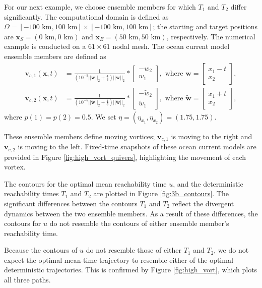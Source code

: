 \documentclass[pdflatex,sn-mathphys-num]{sn-jnl}%
\def \bx{{\mathbf {x}}}
\def \bv{{\mathbf {v}}}
\def \bw{{\mathbf {w}}}
\theoremstyle{thmstyleone}%
\theoremstyle{thmstyletwo}%
\theoremstyle{thmstylethree}%
\begin{document}
For our next example, we choose ensemble members for which $T_1$ and $T_2$ differ significantly.  The computational domain is defined as $\Omega = [-100\text{ km},100\text{ km}] \times [-100\text{ km},100\text{ km}]$; the starting and target positions are $\bx_S = (0\text{ km},0\text{ km})$ and $\bx_E = (50\text{ km},50\text{ km})$, respectively.  The numerical example is conducted on a $61 \times 61$ nodal mesh.
The ocean current model ensemble members are defined as 
\begin{align}
\bv_{c,1}(\bx,t) &=\frac{1}{(10^{-5}||\bw||_2+\frac{4}{3})||\bw||_2}*\begin{bmatrix}
            -w_2 \\
            w_1
        \end{bmatrix}, \text{ where } \bw = \begin{bmatrix}
            x_1 - t \\
            x_2
        \end{bmatrix}, \\
\bv_{c,2}(\bx,t)&=\frac{1}{(10^{-5}||\tilde{\bw}||_2+\frac{4}{3})||\tilde{\bw}||_2}*\begin{bmatrix}
            -\tilde{w}_2 \\
            \tilde{w}_1
        \end{bmatrix}, \text{ where } \tilde{\bw} =\begin{bmatrix}
            x_1 + t \\
            x_2
\end{bmatrix},
\end{align}
where $p(1)=p(2)=0.5$.  We set $\eta=(\eta_{x_1},\eta_{x_2})=(1.75,1.75)$.

These ensemble members define moving vortices; $\bv_{c,1}$ is moving to the right and $\bv_{c,2}$ is moving to the left.  Fixed-time snapshots of these ocean current models are provided in Figure \ref{fig:high_vort_quivers}, highlighting the movement of each vortex.  


The contours for the optimal mean reachability time $u$, and the deterministic reachability times $T_1$ and $T_2$ are plotted in Figure \ref{fig:3b_contours}.  The significant differences between the contours $T_1$ and $T_2$ reflect the divergent dynamics between the two ensemble members.  As a result of these differences, the contours for $u$ do not resemble the contours of either ensemble member's reachability time.

Because the contours of $u$ do not resemble those of either $T_1$ and $T_2$, we do not expect the optimal mean-time trajectory to resemble either of the optimal deterministic trajectories.  This is confirmed by Figure \ref{fig:high_vort}, which plots all three paths.  
\end{document}
